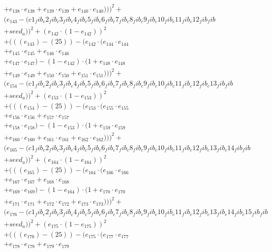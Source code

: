 \documentclass[10pt, a4paper]{article}
\begin{document}
\begin{align*}
& + e_{138} \cdot e_{138} + e_{139} \cdot e_{139} + e_{140} \cdot e_{140})))^{2} + \\
& (e_{143} - (c1_fib_c2_fib_c3_fib_c4_fib_c5_fib_c6_fib_c7_fib_c8_fib_c9_fib_c10_fib_c11_fib_c12_fib_fib \\
& + seed_a))^{2} + (e_{142} \cdot (1 - e_{142}))^{2} \\
& + (((e_{143}) - (25)) - (e_{142} \cdot (e_{144} \cdot e_{144} \\
& + e_{145} \cdot e_{145} + e_{146} \cdot e_{146} \\
& + e_{147} \cdot e_{147}) - (1 - e_{142}) \cdot (1 + e_{148} \cdot e_{148} \\
& + e_{149} \cdot e_{149} + e_{150} \cdot e_{150} + e_{151} \cdot e_{151})))^{2} + \\
& (e_{154} - (c1_fib_c2_fib_c3_fib_c4_fib_c5_fib_c6_fib_c7_fib_c8_fib_c9_fib_c10_fib_c11_fib_c12_fib_c13_fib_fib \\
& + seed_a))^{2} + (e_{153} \cdot (1 - e_{153}))^{2} \\
& + (((e_{154}) - (25)) - (e_{153} \cdot (e_{155} \cdot e_{155} \\
& + e_{156} \cdot e_{156} + e_{157} \cdot e_{157} \\
& + e_{158} \cdot e_{158}) - (1 - e_{153}) \cdot (1 + e_{159} \cdot e_{159} \\
& + e_{160} \cdot e_{160} + e_{161} \cdot e_{161} + e_{162} \cdot e_{162})))^{2} + \\
& (e_{165} - (c1_fib_c2_fib_c3_fib_c4_fib_c5_fib_c6_fib_c7_fib_c8_fib_c9_fib_c10_fib_c11_fib_c12_fib_c13_fib_c14_fib_fib \\
& + seed_a))^{2} + (e_{164} \cdot (1 - e_{164}))^{2} \\
& + (((e_{165}) - (25)) - (e_{164} \cdot (e_{166} \cdot e_{166} \\
& + e_{167} \cdot e_{167} + e_{168} \cdot e_{168} \\
& + e_{169} \cdot e_{169}) - (1 - e_{164}) \cdot (1 + e_{170} \cdot e_{170} \\
& + e_{171} \cdot e_{171} + e_{172} \cdot e_{172} + e_{173} \cdot e_{173})))^{2} + \\
& (e_{176} - (c1_fib_c2_fib_c3_fib_c4_fib_c5_fib_c6_fib_c7_fib_c8_fib_c9_fib_c10_fib_c11_fib_c12_fib_c13_fib_c14_fib_c15_fib_fib \\
& + seed_a))^{2} + (e_{175} \cdot (1 - e_{175}))^{2} \\
& + (((e_{176}) - (25)) - (e_{175} \cdot (e_{177} \cdot e_{177} \\
& + e_{178} \cdot e_{178} + e_{179} \cdot e_{179} \\

\end{align*}
\end{document}
